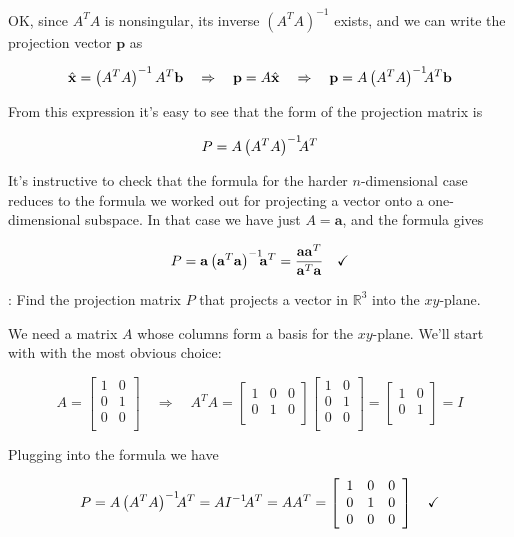 \documentclass[12pt]{article}
\newcommand{\bs}{\hspace{-.75mm}}
\newcommand{\nin}{\noindent}
\newcommand{\vthree}{\vspace{3mm}}
\newcommand{\myp}[1]{\left( #1 \right)}
\newcommand{\R}[1]{\mathbb{R}^{#1}}
\newcommand{\mymat}[1]{
\left[
\begin{array}{rrrrrrrrrrrrrrrrrrrrrrrrrrrrrrrrrrrrrrr}
#1
\end{array}
\right]
}
\newcommand{\bx}{\mathbf{x}}
\newcommand{\bp}{\mathbf{p}}
\newcommand{\ba}{\mathbf{a}}
\newcommand{\bb}{\mathbf{b}}
\begin{document}
\vthree

\nin OK, since $A^TA$ is nonsingular, its inverse $\myp{A^TA}^{-1}$ exists, and we can write the projection vector $\bp$ as

\[
\hat{\bx} = \myp{A^TA}^{-1}A^T\bb
\quad \Rightarrow \quad
\bp = A\hat{\bx}
\quad \Rightarrow \quad
\bp = A\myp{A^TA}^{-1}\bs\bs A^T\bb
\]

\vthree

\nin From this expression it's easy to see that the form of the projection matrix is


\[
P = A\myp{A^TA}^{-1}\bs\bs A^T
\]

\vthree

\nin It's instructive to check that the formula for the harder $n$-dimensional case reduces to the formula we worked out for projecting a vector onto a one-dimensional subspace.  In that case we have just $A = \ba$, and the formula gives

\[
P = \ba\myp{\ba^T\ba}^{-1}\bs\bs\ba^T = \frac{\ba\ba^T}{\ba^T\ba} \quad \checkmark
\]

\vthree

\nin {\bf Example 1}: Find the projection matrix $P$ that projects a vector in $\R{3}$ into the $xy$-plane.

\vthree

\nin We need a matrix $A$ whose columns form a basis for the $xy$-plane.  We'll start with with the most obvious choice:

\[
A = \mymat{
1 & 0 \\
0 & 1 \\
0 & 0 \\
}
\quad \Rightarrow \quad
A^TA = \mymat{
1 & 0 & 0  \\
0 & 1 & 0 \\
}
\mymat{
1 & 0 \\
0 & 1 \\
0 & 0 \\
}
=
\mymat{
1 & 0   \\
0 & 1   \\
}
= I
\]

\vthree

\nin Plugging into the formula we have

\[
P = A\myp{A^TA}^{-1}\bs\bs A^T = AI^{-1}\bs A^T = AA^T =
\mymat{
1 & 0 & 0  \\
0 & 1 & 0 \\
0 & 0 & 0 \\
}
\quad \checkmark
\]

\clearpage
\end{document}
